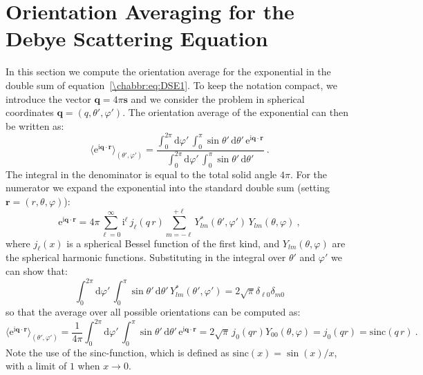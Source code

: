 \section{Orientation Averaging for the Debye Scattering Equation}\label{\chabbr:sec:average}

In this section we compute the orientation average for the exponential in the double sum of equation~\ref{\chabbr:eq:DSE1}. To keep the notation compact, we introduce the vector $\mathbf{q}=4\pi\mathbf{s}$ and we consider the problem in spherical coordinates $\mathbf{q}=(q,\theta',\varphi')$.  The orientation average of the exponential can then be written as:  
\[
\langle\mathrm{e}^{\mathrm{i}\mathbf{q}\cdot\mathbf{r}}\rangle_{(\theta',\varphi')} = \frac{\int_0^{2\pi}\mathrm{d}\varphi'\,\int_0^{\pi}\sin\theta'\,\mathrm{d}\theta'\,\mathrm{e}^{\mathrm{i}\mathbf{q}\cdot\mathbf{r}}}{\int_0^{2\pi}\mathrm{d}\varphi'\,\int_0^{\pi}\sin\theta'\,\mathrm{d}\theta'}\ .
\]
The integral in the denominator is equal to the total solid angle $4\pi$. For the numerator we expand the exponential into the standard double sum (setting $\mathbf{r}=(r,\theta,\varphi)$):
\[
\mathrm{e}^{\mathrm{i}\mathbf{q}\cdot\mathbf{r}}=4\pi\sum_{\ell=0}^{\infty}\mathrm{i}^{\ell}\,j_{\ell}(q\,r)\sum_{m=-\ell}^{+\ell}Y^{\ast}_{lm}(\theta',\varphi')\,Y_{lm}(\theta,\varphi)\ ,
\]
where $j_\ell(x)$ is a spherical Bessel function of the first kind, and $Y_{lm}(\theta,\varphi)$ are the spherical harmonic functions.  Substituting in the integral over $\theta'$ and $\varphi'$ we can show that:
\[
	\int_0^{2\pi}\mathrm{d}\varphi'\,\int_0^{\pi}\sin\theta'\,\mathrm{d}\theta'\,Y^{\ast}_{lm}(\theta',\varphi')=2\sqrt{\pi}\delta_{\ell 0}\delta_{m 0}
\]
so that the average over all possible orientations can be computed as:
\[
\langle\mathrm{e}^{\mathrm{i}\mathbf{q}\cdot\mathbf{r}}\rangle_{(\theta',\varphi')} = \frac{1}{4\pi}\int_0^{2\pi}\mathrm{d}\varphi'\,\int_0^{\pi}\sin\theta'\,\mathrm{d}\theta'\,\mathrm{e}^{\mathrm{i}\mathbf{q}\cdot\mathbf{r}}=2\sqrt{\pi}\,j_0(q r)Y_{00}(\theta,\varphi)=j_0(q r)=\text{sinc}(q\,r)\ .
\]
Note the use of the \textsf{sinc}-function, which is defined as $\text{sinc}(x)=\sin(x)/x$, with a limit of $1$ when $x\rightarrow 0$.
